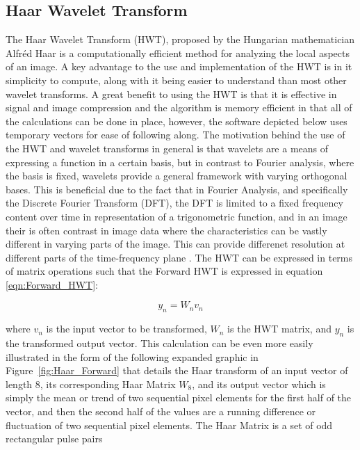 \documentclass{article}\raggedbottom
\begin{document}
\subsection{Haar Wavelet Transform}
The Haar Wavelet Transform (HWT), proposed by the Hungarian mathematician Alfr\'ed Haar is a computationally efficient method for analyzing the local aspects of an image. A key advantage to the use and implementation of the HWT is in it simplicity to compute, along with it being easier to understand than most other wavelet transforms. A great benefit to using the HWT is that it is effective in signal and image compression and the algorithm is memory efficient in that all of the calculations can be done in place, however, the software depicted below uses temporary vectors for ease of following along. The motivation behind the use of the HWT and wavelet transforms in general is that wavelets are a means of expressing a function in a certain basis, but in contrast to Fourier analysis, where the basis is fixed, wavelets provide a general framework with varying orthogonal bases. This is beneficial due to the fact that in Fourier Analysis, and specifically the Discrete Fourier Transform (DFT), the DFT is limited to a fixed frequency content over time in representation of a trigonometric function, and in an image their is often contrast in image data where the characteristics can be vastly different in varying parts of the image. This can provide differenet resolution at different parts of the time-frequency plane \cite{porwik2004haar}. The HWT can be expressed in terms of matrix operations such that the Forward HWT is expressed in equation \eqref{eqn:Forward_HWT}:  

\begin{equation}\label{eqn:Forward_HWT}
y_{n} = W_{n}v_{n}
\end{equation}	 
 
 where $v_{n}$ is the input vector to be transformed, $W_{n}$ is the HWT matrix, and $y_{n}$ is the transformed output vector. This calculation can be even more easily illustrated in the form of the following expanded graphic in Figure~\ref{fig:Haar_Forward} that details the Haar transform of an input vector of length $8$, its corresponding Haar Matrix $W_{8}$, and its output vector which is simply the mean or trend of two sequential pixel elements for the first half of the vector, and then the second half of the values are a running difference or fluctuation of two sequential pixel elements. The Haar Matrix is a set of odd rectangular pulse pairs
 
\end{document}
